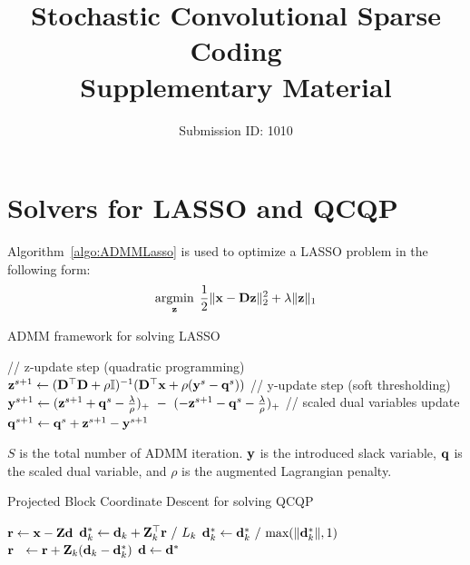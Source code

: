 \documentclass{egpubl}
\title{Stochastic Convolutional Sparse Coding \\
        Supplementary Material}
\author{Submission ID: 1010}
\begin{document}

\maketitle
\section{Solvers for LASSO and QCQP}
Algorithm~\ref{algo:ADMMLasso} is used to optimize a LASSO problem in the following form:
\begin{equation}
    \minimize{\code} \frac{1}{2}\|\signal - \Filter \code \|_2^2 + \lambda\| \code \|_1
\end{equation}

\begin{algorithm}
\caption{ADMM framework for solving LASSO} \label{algo:ADMMLasso}
\begin{algorithmic}[1]
        \State // z-update step (quadratic programming)
        \State $\code^{s+1} \gets (\Filter ^ \top \Filter + \rho \Id )^{-1}(\Filter^\top \signal + \rho(\Vector{y}^s - \Vector{q}^s ) )$
        \State // y-update step (soft thresholding)
        \State $\Vector{y}^{s+1} \gets (\code^{s+1}+\Vector{q}^{s} - \frac{\lambda}{\rho})_{+} ~ - ~ (-\code^{s+1}-\Vector{q}^{s} - \frac{\lambda}{\rho})_{+}$
        \State // scaled dual variables update
        \State $\Vector{q}^{s+1} \gets \bold{q}^{s}+\code^{s+1}-\Vector{y}^{s+1}$
    \EndFor
\end{algorithmic}
\end{algorithm}
$S$ is the total number of ADMM iteration. $\Vector{y}$ is the introduced slack variable, $\Vector{q}$ is the scaled dual variable, and $\rho$ is the augmented Lagrangian penalty.

\begin{algorithm}
\caption{Projected Block Coordinate Descent for solving QCQP} \label{algo:BCDQCQP}
\begin{algorithmic}[1]
\State $\Vector{r} \gets \signal - \Code \filter $
        \State $ \filter^{\ast}_k \gets \filter_k + \Code_k ^ \top \Vector{r} ~ / ~ L_k $
        \State $ \filter^{\ast}_k \gets \filter^{\ast}_k ~ / ~ \text{max}( \|\filter^{\ast}_k\|,1 ) $
        \State $ \Vector{r} ~~ \gets \Vector{r} + \Code_k( \filter_k - \filter^{\ast}_k ) $
    \EndFor
    \State  $ \filter \gets \filter^{\ast} $
\EndWhile
\end{algorithmic}
\end{algorithm}
\end{document}
